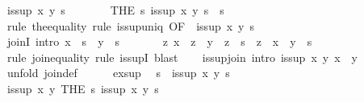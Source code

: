 \begin{isabellebody}
\ {\isachardoublequoteopen}is{\isacharunderscore}sup\ x\ y\ s{\isachardoublequoteclose}\isanewline
\ \ \ \ \isamarkupfalse%
\ \isamarkupfalse%
\ {\isachardoublequoteopen}{\isacharparenleft}THE\ s{\isachardot}\ is{\isacharunderscore}sup\ x\ y\ s{\isacharparenright}\ {\isacharequal}\ s{\isachardoublequoteclose}\isanewline
\ \ \ \ \ \ \isamarkupfalse%
\ {\isacharparenleft}rule\ the{\isacharunderscore}equality{\isacharparenright}\ {\isacharparenleft}rule\ is{\isacharunderscore}sup{\isacharunderscore}uniq\ {\isacharbrackleft}OF\ {\isacharunderscore}\ {\isacharbackquoteopen}is{\isacharunderscore}sup\ x\ y\ s{\isacharbackquoteclose}{\isacharbrackright}{\isacharparenright}\isanewline
\ \ \isamarkupfalse%
\isanewline
\isanewline
\ \ \isamarkupfalse%
\ joinI\ {\isacharbrackleft}intro{\isacharquery}{\isacharbrackright}{\isacharcolon}\ {\isachardoublequoteopen}x\ {\isasymsqsubseteq}\ s\ {\isasymLongrightarrow}\ y\ {\isasymsqsubseteq}\ s\ {\isasymLongrightarrow}\isanewline
\ \ \ \ \ \ {\isacharparenleft}{\isasymAnd}z{\isachardot}\ x\ {\isasymsqsubseteq}\ z\ {\isasymLongrightarrow}\ y\ {\isasymsqsubseteq}\ z\ {\isasymLongrightarrow}\ s\ {\isasymsqsubseteq}\ z{\isacharparenright}\ {\isasymLongrightarrow}\ x\ {\isasymsqunion}\ y\ {\isacharequal}\ s{\isachardoublequoteclose}\isanewline
\ \ \ \ \isamarkupfalse%
\ {\isacharparenleft}rule\ join{\isacharunderscore}equality{\isacharcomma}\ rule\ is{\isacharunderscore}supI{\isacharparenright}\ blast{\isacharplus}\isanewline
\isanewline
\ \ \isamarkupfalse%
\ is{\isacharunderscore}sup{\isacharunderscore}join\ {\isacharbrackleft}intro{\isacharquery}{\isacharbrackright}{\isacharcolon}\ {\isachardoublequoteopen}is{\isacharunderscore}sup\ x\ y\ {\isacharparenleft}x\ {\isasymsqunion}\ y{\isacharparenright}{\isachardoublequoteclose}\isanewline
\ \ \isamarkupfalse%
\ {\isacharparenleft}unfold\ join{\isacharunderscore}def{\isacharparenright}\isanewline
\ \ \ \ \isamarkupfalse%
\ ex{\isacharunderscore}sup\ \isamarkupfalse%
\ s\ \ {\isachardoublequoteopen}is{\isacharunderscore}sup\ x\ y\ s{\isachardoublequoteclose}\ \isacommand{{\isachardot}{\isachardot}}\isamarkupfalse%
\isanewline
\ \ \ \ \isamarkupfalse%
\ \isamarkupfalse%
\ {\isachardoublequoteopen}is{\isacharunderscore}sup\ x\ y\ {\isacharparenleft}THE\ s{\isachardot}\ is{\isacharunderscore}sup\ x\ y\ s{\isacharparenright}{\isachardoublequoteclose}\isanewline
\ \ \ \ \ \ \isamarkupfalse%

\end{isabellebody}
